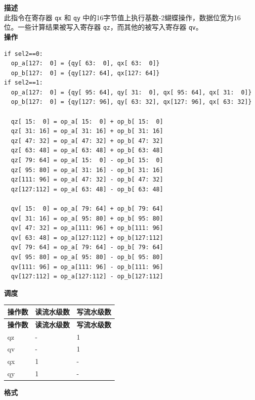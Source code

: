 \textbf{描述}\\
此指令在寄存器 \lstinline{qx} 和 \lstinline{qy} 中的16字节值上执行基数-2蝴蝶操作，数据位宽为16位。一些计算结果被写入寄存器 \lstinline{qz}，而其他的被写入寄存器 \lstinline{qv}。\\
\textbf{操作}
\begin{lstlisting}
if sel2==0:
  op_a[127:  0] = {qy[ 63:  0], qx[ 63:  0]}
  op_b[127:  0] = {qy[127: 64], qx[127: 64]}
if sel2==1:
  op_a[127:  0] = {qy[ 95: 64], qy[ 31:  0], qx[ 95: 64], qx[ 31:  0]}
  op_b[127:  0] = {qy[127: 96], qy[ 63: 32], qx[127: 96], qx[ 63: 32]}

  qz[ 15:  0] = op_a[ 15:  0] + op_b[ 15:  0]
  qz[ 31: 16] = op_a[ 31: 16] + op_b[ 31: 16]
  qz[ 47: 32] = op_a[ 47: 32] + op_b[ 47: 32]
  qz[ 63: 48] = op_a[ 63: 48] + op_b[ 63: 48]
  qz[ 79: 64] = op_a[ 15:  0] - op_b[ 15:  0]
  qz[ 95: 80] = op_a[ 31: 16] - op_b[ 31: 16]
  qz[111: 96] = op_a[ 47: 32] - op_b[ 47: 32]
  qz[127:112] = op_a[ 63: 48] - op_b[ 63: 48]

  qv[ 15:  0] = op_a[ 79: 64] + op_b[ 79: 64]
  qv[ 31: 16] = op_a[ 95: 80] + op_b[ 95: 80]
  qv[ 47: 32] = op_a[111: 96] + op_b[111: 96]
  qv[ 63: 48] = op_a[127:112] + op_b[127:112]
  qv[ 79: 64] = op_a[ 79: 64] - op_b[ 79: 64]
  qv[ 95: 80] = op_a[ 95: 80] - op_b[ 95: 80]
  qv[111: 96] = op_a[111: 96] - op_b[111: 96]
  qv[127:112] = op_a[127:112] - op_b[127:112]
\end{lstlisting}

\textbf{调度}\\
\begin{longtable}[c]{|l|l|l|}
    \hline
    \rowcolor{lightgray}
    \textbf{操作数} & \textbf{读流水级数} & \textbf{写流水级数} \\\hline
    \endfirsthead
    \hline
    \rowcolor{lightgray}
     \textbf{操作数} & \textbf{读流水级数} & \textbf{写流水级数} \\\hline
    \endhead
    \hline
    \endfoot

  qz & - & 1 \\\hline
  qv & - & 1 \\\hline
  qx & 1 & - \\\hline
  qy & 1 & -

\end{longtable}

\textbf{格式}\\


